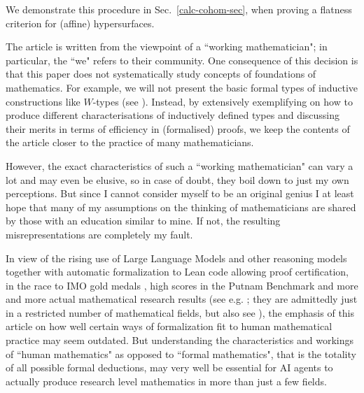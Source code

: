 \documentclass{amsart}
\theoremstyle{plain}
\numberwithin{equation}{section} %
\numberwithin{figure}{section} %
\theoremstyle{plain}
\theoremstyle{plain}
\theoremstyle{plain}
\theoremstyle{plain}
\theoremstyle{plain}
\theoremstyle{plain}
\theoremstyle{remark}
\theoremstyle{remark}
\theoremstyle{remark}
\begin{document}
\begin{itemize}
We demonstrate this procedure in Sec.~\ref{calc-cohom-sec}, when proving a flatness criterion for (affine) hypersurfaces. 
\end{itemize}

The article is written from the viewpoint of a ``working mathematician"; in particular, the ``we" refers to their community. One consequence of this decision is that this paper does not systematically study concepts of foundations of mathematics. For example, we will not present the basic formal types of inductive constructions like $W$-types (see \cite[5.3]{HoTTBook}). Instead, by extensively exemplifying on how to produce different characterisations of inductively defined types and discussing their merits in terms of efficiency in (formalised) proofs, we keep the contents of the article closer to the practice of many mathematicians.

However, the exact characteristics of such a ``working mathematician" can vary a lot and may even be elusive, so in case of doubt, they boil down to just my own perceptions. But since I cannot consider myself to be an original genius I at least hope that many of my assumptions on the thinking of mathematicians are shared by those with an education similar to mine. If not, the resulting misrepresentations are completely my fault. 

In view of the rising use of Large Language Models and other reasoning models together with automatic formalization to Lean code allowing proof certification, in the race to IMO gold medals \cite{BuzXena2}, high scores in the Putnam Benchmark \cite{LogInt1} and more and more actual mathematical research results (see e.g. \cite{BuzXena3}; they are admittedly just in a restricted number of mathematical fields, but also see \cite{Gauss}), the emphasis of this article on how well certain ways of formalization fit to human mathematical practice may seem outdated. But understanding the characteristics and workings of ``human mathematics" as opposed to ``formal mathematics", that is the totality of all possible formal deductions, may very well be essential for AI agents to actually produce research level mathematics in more than just a few fields.
\end{document}
